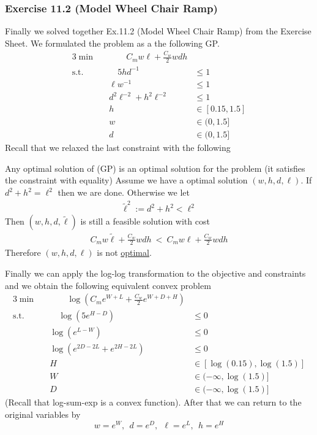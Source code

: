 \documentclass[answers]{exam}
\begin{document}
    \subsubsection*{Exercise 11.2 (Model Wheel Chair Ramp)}
    Finally we solved together Ex.11.2 (Model Wheel Chair Ramp) from the Exercise Sheet.
    We formulated the problem as a the following GP.
    \begin{alignat*}{3}
        \min &&\qquad C_mw\ell + \frac{C_w}{2} wdh & \\ 
        \text{s.t.}&& \quad 5hd^{-1} &\leq 1 \\ 
        &&\ell w^{-1} &\leq 1 \\ 
        &&d^2\ell^{-2} + h^2\ell^{-2} &\leq 1 \\ 
        &&h &\in [0.15, 1.5] \\ 
        &&w &\in (0, 1.5] \\ 
        &&d &\in (0, 1.5] 
    \end{alignat*}
    Recall that we relaxed the last constraint with the following
    \begin{claim}{Any optimal solution of (GP) is an optimal solution for the problem (it satisfies the constraint with equality)}
        Assume we have a optimal solution $(w, h, d, \ell)$. If $d^2 + h^2= \ell^2$ then we are done. Otherwise we let 
        \begin{align*}
            \tilde{\ell}^2 := d^2 + h^2 < \ell^2
        \end{align*}
        Then $(w, h, d, \tilde{\ell})$ is still a feasible solution with cost 
        \begin{align*}
            C_mw\tilde{\ell} + \frac{C_w}{2} wdh\ <\ C_mw\ell + \frac{C_w}{2} wdh
        \end{align*}
        Therefore $(w, h, d, \ell)$ is not \underline{optimal}. \lightning
    \end{claim}
    Finally we can apply the log-log transformation to the objective and constraints and we obtain the following equivalent convex problem 
    \begin{alignat*}{3}
        \min &&\qquad \log(C_me^{W+L} + \frac{C_w}{2} e^{W+D+H}) & \\ 
        \text{s.t.}&& \quad \log(5e^{H-D}) &\leq 0 \\ 
        &&\log(e^{L - W}) &\leq 0 \\ 
        &&\log(e^{2D-2L} + e^{2H-2L}) &\leq 0 \\ 
        &&H &\in [\log(0.15), \log(1.5)] \\ 
        &&W &\in (-\infty, \log(1.5)] \\ 
        &&D &\in (-\infty, \log(1.5)] 
    \end{alignat*}
    (Recall that log-sum-exp is a convex function). After that we can return to the original variables by 
    $$ w = e^{W},\ \ d= e^{D},\ \ \ell = e^{L},\ \ h=e^{H} $$
\end{document}
